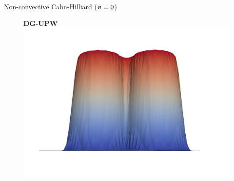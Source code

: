 \begin{frame}{Non-convective Cahn-Hilliard {\small($\boldsymbol{v}=0$)}}
\begin{figure}[t]
\begin{minipage}{0.32\textwidth}
			\centering
			\textbf{DG-UPW}
			\includegraphics[scale=0.07]{img/non-convective-cahn-hilliard/w_sol_DG-UPW_nt-1000_nx-50_T-0.001_P0_adv-0.0_nx-50.png}
		\end{minipage}
	\end{figure}
\end{frame}

